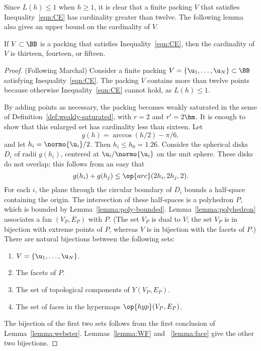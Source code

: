 Since $L(h)\le 1$ when $h\ge1$, it is clear that a finite packing $V$
that satisfies Inequality~\ref{eqn:CE} has cardinality greater than twelve.
The following lemma also gives an upper bound on the cardinality of $V$.

\begin{lemma}[]\label{lemma:13-14}  %
If $V\subset \BB$ is a packing that satisfies
Inequality~\ref{eqn:CE},  then the cardinality of $V$ is thirteen, fourteen, or fifteen.
\end{lemma}


\begin{proof} (Following Marchal)
Consider a finite packing $ V=\{\u_1,\ldots, \u_N\}\subset \BB$ satisfying
Inequality~\ref{eqn:CE}.  The packing $V$ contains more than twelve points because otherwise
Inequality~\ref{eqn:CE} cannot hold, as $L(h)\le 1$.

By adding points
as necessary, the packing becomes weakly saturated in the sense of
Definition~\ref{def:weakly-saturated}, with $r=2$ and $r'=2\hm$.  It is enough to show
that this enlarged set has cardinality less than sixteen.    Let
\[ %
g(h) = \arccos(h/2) - \pi/6,  %
\] %
and let $h_i =
\normo{ \u_i}/2$.  Then $h_i\le h_0=1.26$.
Consider the spherical disks $D_i$ of radii $g(h_i)$,
centered at $ \u_i/\normo{ \u_i}$ on the unit sphere.  These disks do not overlap; this
follows from an easy 
that
\begin{equation}\label{eqn:disks} 
g(h_i) + g(h_j) \le \op{arc}(2h_i,2h_j,2).%
\end{equation}%
%
For each $i$, the plane through the circular boundary of $D_i$ bounds
a half-space containing the origin.  The intersection of these
half-spaces is a polyhedron $P$, which is bounded by
Lemma~\ref{lemma:poly-bounded}.  Lemma~\ref{lemma:polyhedron}
associates a fan $(V_P,E_P)$ with $P$.  (The set $V_P$ is dual to $
V$; the set $V_P$ is in bijection with extreme points of $P$, whereas $
V$ is in bijection with the facets of $P$.)  There are natural
bijections between the following sets:
\begin{enumerate}\wasitemize  
\item $ V = \{ \u_1,\ldots, \u_N\}$.
\item The  facets of $P$.
\item The set of  topological components of $Y(V_P,E_P)$.
\item The set of faces in the hypermaps $\op{hyp}(V_P,E_P)$.
\end{enumerate}\wasitemize 
The bijection of the first two sets follows from the first conclusion
of Lemma~\ref{lemma:webster}.  Lemmas~\ref{lemma:WF} and
~\ref{lemma:face} give the other two bijections.


\end{proof}
